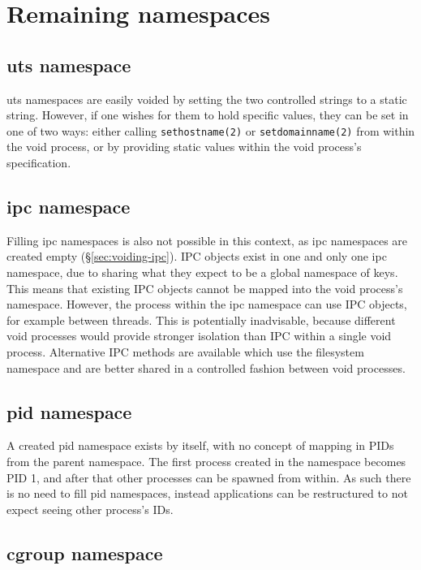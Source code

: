 \documentclass[12pt,a4paper,twoside]{report}
\begin{document}
\section{Remaining namespaces}

\subsection{uts namespace}
\label{sec:filling-uts}

uts namespaces are easily voided by setting the two controlled strings to a static string. However, if one wishes for them to hold specific values, they can be set in one of two ways: either calling \texttt{sethostname(2)} or \texttt{setdomainname(2)} from within the void process, or by providing static values within the void process's specification.

\subsection{ipc namespace}
\label{sec:filling-ipc}

Filling ipc namespaces is also not possible in this context, as ipc namespaces are created empty (§\ref{sec:voiding-ipc}). IPC objects exist in one and only one ipc namespace, due to sharing what they expect to be a global namespace of keys. This means that existing IPC objects cannot be mapped into the void process's namespace. However, the process within the ipc namespace can use IPC objects, for example between threads. This is potentially inadvisable, because different void processes would provide stronger isolation than IPC within a single void process. Alternative IPC methods are available which use the filesystem namespace and are better shared in a controlled fashion between void processes.

\subsection{pid namespace}
\label{sec:filling-pid}

A created pid namespace exists by itself, with no concept of mapping in PIDs from the parent namespace. The first process created in the namespace becomes PID 1, and after that other processes can be spawned from within. As such there is no need to fill pid namespaces, instead applications can be restructured to not expect seeing other process's IDs.

\subsection{cgroup namespace}
\label{sec:filling-cgroup}
\end{document}
